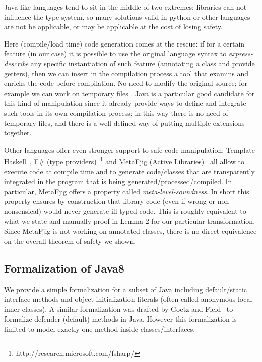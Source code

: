 Java-like languages tend to sit in the middle of two extremes: libraries
can not influence the type system, so many solutions valid in python or other
languages are not be applicable, or may be applicable at the cost of losing
safety.

Here (compile/load time) code generation comes at the rescue: if for a certain
feature (\mixin in our case) it is possible to use the original language syntax
to \emph{express-describe} any specific instantiation of such feature
(annotating a class and provide getters), then we can insert in the compilation
process a tool that examins and enrichs the code before compilation. No need to
modify the original source; for example we can work on temporary files
. Java is
a particular good candidate for this kind of manipulation since it already
provide ways to define and integrate such tools in its own compilation process:
in this way there is no need of temporary files, and there is a well defined way
of putting multiple extensions together.

Other languages offer even stronger support to safe code manipulation:
Template Haskell~\cite{sheard2002template}, F\# (type providers)~\footnote{http://research.microsoft.com/fsharp/} and MetaFjig (Active Libraries)~\cite{servetto2010metafjig}
all allow to execute code at compile time and to generate code/classes that are transparently integrated in the program that is being generated/processed/compiled.
In particular, MetaFjig offers a property called \emph{meta-level-soundness}. In short this property ensures by construction that library code (even if wrong or non nonsensical) would never generate ill-typed code. This is roughly equivalent to what we state and manually proof in Lemma 2 for our particular transformation.
Since MetaFjig is not working on annotated classes, there is no direct equivalence on the overall theorem of safety we shown.

\subsection{Formalization of Java8}
We provide a simple formalization for a subset of Java
including default/static interface methods and object initialization literals
(often called anonymous local inner classes).  A similar formalization was
drafted by Goetz and Field~\cite{goetz12fdefenders} to formalize defender
(default) methods in Java. However this formalization is limited to model
exactly one method inside classes/interfaces.

